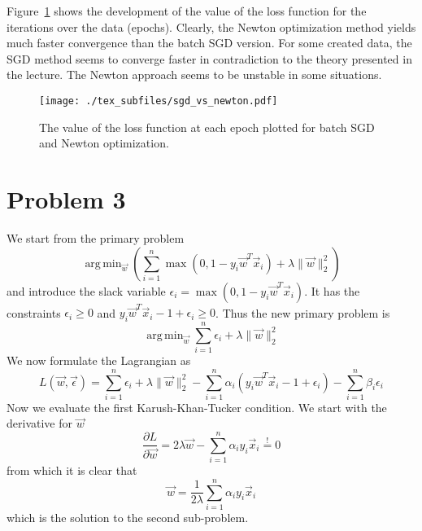 \documentclass[a4paper]{article}
\DeclareMathOperator*{\argmin}{arg\,min}
\begin{document}
Figure~\ref{fig:sgd_vs_newton} shows the development of the value of the loss
function for the iterations over the data (epochs). Clearly, the Newton
optimization method yields much faster convergence than the batch SGD version.
For some created data, the SGD method seems to converge faster in contradiction
to the theory presented in the lecture. The Newton approach seems to be unstable
in some situations.

\begin{figure}[hbt]
    \texttt{[image: ./tex\_subfiles/sgd\_vs\_newton.pdf]}
    \caption{The value of the loss function at each epoch plotted for batch SGD
    and Newton optimization.}\label{fig:sgd_vs_newton}
\end{figure}

\section{Problem 3}
We start from the primary problem
\begin{equation*}
    \argmin_{\vec{w}}\left(\sum_{i=1}^{n}\max(0,1-y_i\vec{w}^T\vec{x}_i)
    + \lambda\rVert\vec{w}\lVert_2^2\right)
\end{equation*}
and introduce the slack variable $\epsilon_i=\max(0,1-y_i\vec{w}^T\vec{x}_i)$.
It has the constraints $\epsilon_i\geq0$ and
$y_i\vec{w}^T\vec{x}_i-1+\epsilon_i\geq0$.
Thus the new primary problem is
\begin{equation*}
    \argmin_{\vec{w}} \sum_{i=1}^{n}\epsilon_i + \lambda\rVert\vec{w}\lVert_2^2
\end{equation*}
We now formulate the Lagrangian as
\begin{equation}\label{eq:primary_lagrange}
    L(\vec{w}, \vec{\epsilon}) =
    \sum_{i=1}^{n}\epsilon_i
    + \lambda\rVert\vec{w}\lVert_2^2
    - \sum_{i=1}^{n}\alpha_i(y_i\vec{w}^T\vec{x}_i - 1 + \epsilon_i)
    - \sum_{i=1}^{n}\beta_i\epsilon_i
\end{equation}
Now we evaluate the first Karush-Khan-Tucker condition. We start with the
derivative for $\vec{w}$
\begin{equation*}
    \frac{\partial L}{\partial\vec{w}} =
    2\lambda\vec{w}
    - \sum_{i=1}^{n}\alpha_iy_i\vec{x}_i \stackrel{!}{=} 0
\end{equation*}
from which it is clear that
\begin{equation}\label{eq:w_representation}
    \vec{w} = \frac{1}{2\lambda}\sum_{i=1}^{n}\alpha_iy_i\vec{x}_i
\end{equation}
which is the solution to the second sub-problem.
\end{document}
